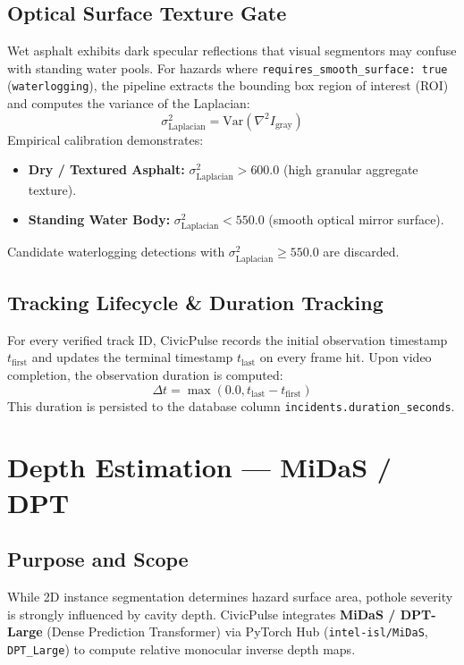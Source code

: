 \documentclass[11pt,a4paper]{article}
\begin{document}
\subsection{Optical Surface Texture Gate}
Wet asphalt exhibits dark specular reflections that visual segmentors may confuse with standing water pools. For hazards where \texttt{requires\_smooth\_surface: true} (\texttt{waterlogging}), the pipeline extracts the bounding box region of interest (ROI) and computes the variance of the Laplacian:
\begin{equation}
\sigma_{\text{Laplacian}}^2 = \text{Var}\left(\nabla^2 I_{\text{gray}}\right)
\end{equation}
Empirical calibration demonstrates:
\begin{itemize}[leftmargin=*]
    \item \textbf{Dry / Textured Asphalt:} $\sigma_{\text{Laplacian}}^2 > 600.0$ (high granular aggregate texture).
    \item \textbf{Standing Water Body:} $\sigma_{\text{Laplacian}}^2 < 550.0$ (smooth optical mirror surface).
\end{itemize}
Candidate waterlogging detections with $\sigma_{\text{Laplacian}}^2 \ge 550.0$ are discarded.

\subsection{Tracking Lifecycle \& Duration Tracking}
For every verified track ID, CivicPulse records the initial observation timestamp $t_{\text{first}}$ and updates the terminal timestamp $t_{\text{last}}$ on every frame hit. Upon video completion, the observation duration is computed:
\begin{equation}
\Delta t = \max\left(0.0, t_{\text{last}} - t_{\text{first}}\right)
\end{equation}
This duration is persisted to the database column \texttt{incidents.duration\_seconds}.

\section{Depth Estimation --- MiDaS / DPT}

\subsection{Purpose and Scope}
While 2D instance segmentation determines hazard surface area, pothole severity is strongly influenced by cavity depth. CivicPulse integrates \textbf{MiDaS / DPT-Large} (Dense Prediction Transformer) via PyTorch Hub (\texttt{intel-isl/MiDaS}, \texttt{DPT\_Large}) to compute relative monocular inverse depth maps.
\end{document}
